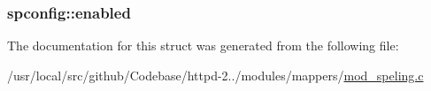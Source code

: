 \subsubsection[{\texorpdfstring{enabled}{enabled}}]{ spconfig\+::enabled}\hypertarget{structspconfig_a516efd22fe1a4e574c99a19b0f5bb09b}{}\label{structspconfig_a516efd22fe1a4e574c99a19b0f5bb09b}


The documentation for this struct was generated from the following file\+:\begin{DoxyCompactItemize}
\item 
/usr/local/src/github/\+Codebase/httpd-\/2../modules/mappers/\hyperlink{mod__speling_8c}{mod\+\_\+speling.\+c}\end{DoxyCompactItemize}
